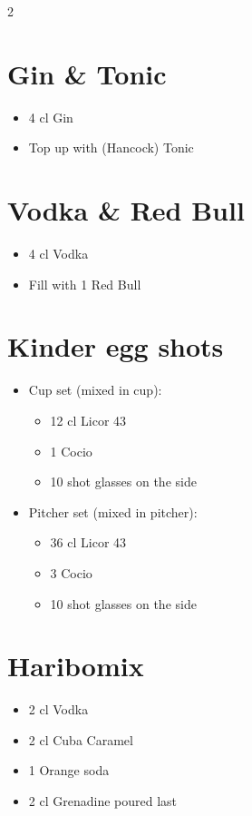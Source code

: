 \documentclass[a4paper,12pt]{article}
\begin{document}
\begin{multicols}{2}
\section*{Gin \& Tonic}
\begin{itemize}
    \item 4 cl Gin
    \item Top up with (Hancock) Tonic
\end{itemize}

\section*{Vodka \& Red Bull}
\begin{itemize}
    \item 4 cl Vodka
    \item Fill with 1 Red Bull
\end{itemize}



\section*{Kinder egg shots}
\begin{itemize}
    \item Cup set (mixed in cup):
    \begin{itemize}
        \item 12 cl Licor 43
        \item 1 Cocio
        \item 10 shot glasses on the side
    \end{itemize}
    \item Pitcher set (mixed in pitcher):
    \begin{itemize}
        \item 36 cl Licor 43
        \item 3 Cocio
        \item 10 shot glasses on the side
    \end{itemize}
\end{itemize}

\columnbreak

\section*{Haribomix}
\begin{itemize}
    \item 2 cl Vodka
    \item 2 cl Cuba Caramel
    \item 1 Orange soda
    \item 2 cl Grenadine poured last
\end{itemize}


\end{multicols}
\end{document}
